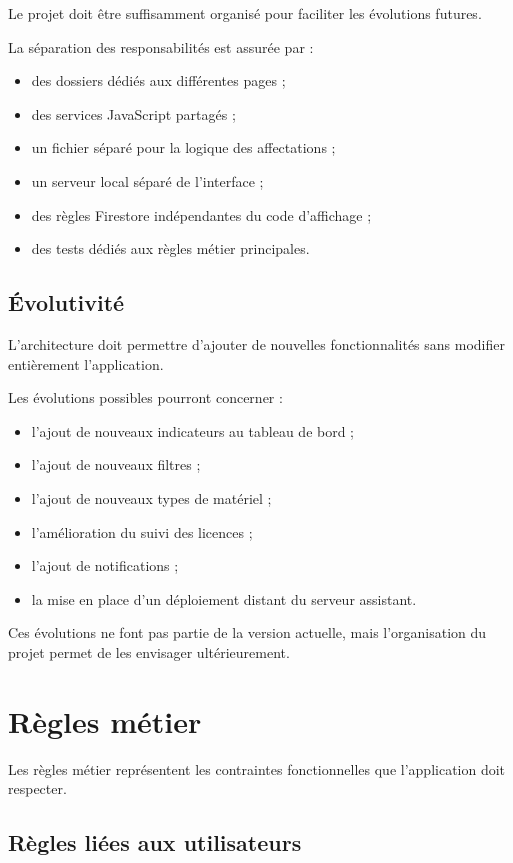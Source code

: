 \documentclass{rapportENSIAS}
\begin{document}
Le projet doit être suffisamment organisé pour faciliter les évolutions futures.

La séparation des responsabilités est assurée par :

\begin{itemize}
\item des dossiers dédiés aux différentes pages ;
\item des services JavaScript partagés ;
\item un fichier séparé pour la logique des affectations ;
\item un serveur local séparé de l’interface ;
\item des règles Firestore indépendantes du code d’affichage ;
\item des tests dédiés aux règles métier principales.
\end{itemize}

\subsection{Évolutivité}

L’architecture doit permettre d’ajouter de nouvelles fonctionnalités sans modifier entièrement l’application.

Les évolutions possibles pourront concerner :

\begin{itemize}
\item l’ajout de nouveaux indicateurs au tableau de bord ;
\item l’ajout de nouveaux filtres ;
\item l’ajout de nouveaux types de matériel ;
\item l’amélioration du suivi des licences ;
\item l’ajout de notifications ;
\item la mise en place d’un déploiement distant du serveur assistant.
\end{itemize}

Ces évolutions ne font pas partie de la version actuelle, mais l’organisation du projet permet de les envisager ultérieurement.

\section{Règles métier}

Les règles métier représentent les contraintes fonctionnelles que l’application doit respecter.

\subsection{Règles liées aux utilisateurs}
\end{document}
